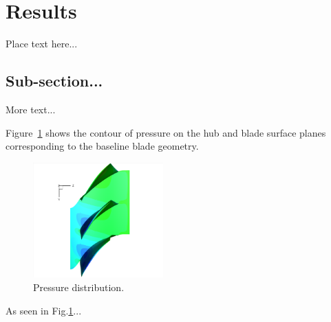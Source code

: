 
\section{Results}
\label{sec:resul}

Place text here...


\subsection{Sub-section...}

More text...

Figure~\ref{fig:blade_flow_pressure} shows the contour of pressure on the hub and blade surface planes corresponding to the baseline blade geometry.

\begin{figure}[H]
  \centering
  \includegraphics[width=5cm]{images/master_flow.png}
  \caption{Pressure distribution.}
  \label{fig:blade_flow_pressure}
\end{figure}

As seen in Fig.\ref{fig:blade_flow_pressure}...


